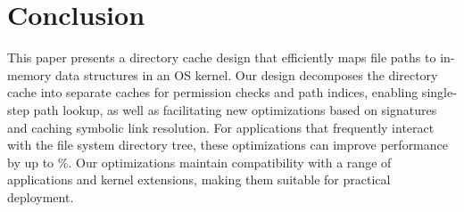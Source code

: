 \section{Conclusion}
\label{sec:conclusion}

This paper presents a directory cache design
that efficiently 
maps file paths to in-memory data structures
in an OS kernel.
Our design decomposes the directory cache into separate caches
for permission checks and path indices, enabling single-step path lookup,
as well as facilitating new optimizations based
on signatures and caching symbolic link resolution.
For applications that frequently 
interact with the file system directory tree, these optimizations 
can improve performance by up to \updatedbspeedup\%.
Our optimizations
maintain compatibility with a range of applications and kernel extensions,
making them suitable for practical deployment.

